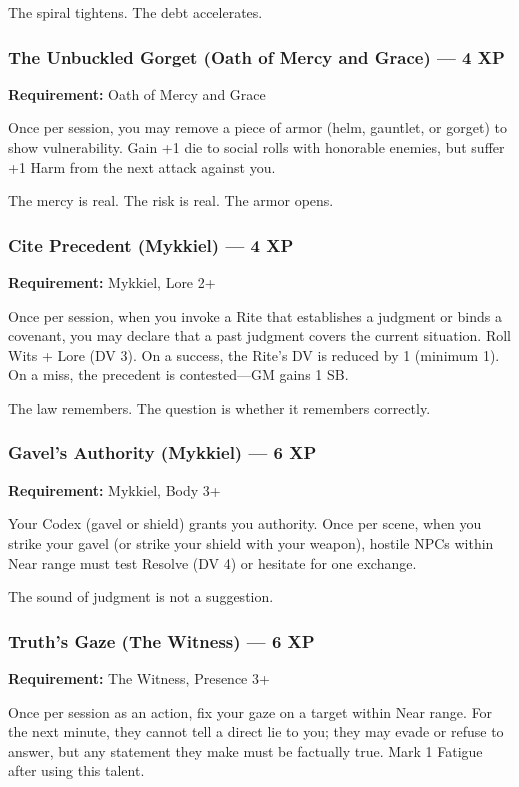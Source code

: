 The spiral tightens. The debt accelerates.

\subsubsection{The Unbuckled Gorget (Oath of Mercy and Grace) — 4 XP}

\textbf{Requirement:} Oath of Mercy and Grace

Once per session, you may remove a piece of armor (helm, gauntlet, or gorget) to show vulnerability. Gain +1 die to social rolls with honorable enemies, but suffer +1 Harm from the next attack against you.

The mercy is real. The risk is real. The armor opens.

\subsubsection{Cite Precedent (Mykkiel) — 4 XP}

\textbf{Requirement:} Mykkiel, Lore 2+

Once per session, when you invoke a Rite that establishes a judgment or binds a covenant, you may declare that a past judgment covers the current situation. Roll Wits + Lore (DV 3). On a success, the Rite's DV is reduced by 1 (minimum 1). On a miss, the precedent is contested—GM gains 1 SB.

The law remembers. The question is whether it remembers correctly.

\subsubsection{Gavel's Authority (Mykkiel) — 6 XP}

\textbf{Requirement:} Mykkiel, Body 3+

Your Codex (gavel or shield) grants you authority. Once per scene, when you strike your gavel (or strike your shield with your weapon), hostile NPCs within Near range must test Resolve (DV 4) or hesitate for one exchange.

The sound of judgment is not a suggestion.

\subsubsection{Truth's Gaze (The Witness) — 6 XP}

\textbf{Requirement:} The Witness, Presence 3+

Once per session as an action, fix your gaze on a target within Near range. For the next minute, they cannot tell a direct lie to you; they may evade or refuse to answer, but any statement they make must be factually true. Mark 1 Fatigue after using this talent.

